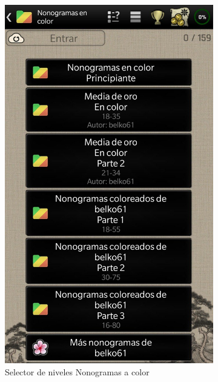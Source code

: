  \begin{figure}[H]
   \centering
   \begin{subfigure}[b]{0.47\linewidth}
     \includegraphics[width=\linewidth]{images/nonokatana2.jpg}
     \caption{Selector de niveles Nonogramas a color}
     \label{fig:katana2-1}
   \end{subfigure}
   \begin{subfigure}[b]{0.47\linewidth}

\end{subfigure}
\end{figure}
